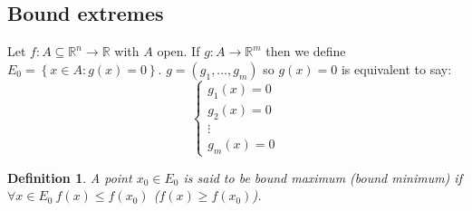\documentclass{article}
\newtheorem{definition}{Definition}
\begin{document}
        \subsection*{Bound extremes}
        Let $f: A \subseteq \mathbb{R}^n \rightarrow \mathbb{R}$ with $A$ open. If $g: A \rightarrow \mathbb{R}^m$ then we define $E_0 = \left\{ x\in A: g(x) = 0 \right\}$. $g = (g_1 ,\dots ,g_m)$ so $g(x) = 0$ is equivalent to say:        
        \begin{equation*}
            \begin{cases}
                g_1(x) = 0 \\
                g_2(x) = 0 \\
                \vdots \\
                g_m(x) = 0
            \end{cases}
        \end{equation*}
        \begin{definition}
            A point  $x_0 \in E_0$ is said to be bound maximum (bound minimum) if $\forall x \in E_0 \ f(x) \leq f(x_0)$ ($f(x) \geq f(x_0)$).
        \end{definition}
\end{document}

